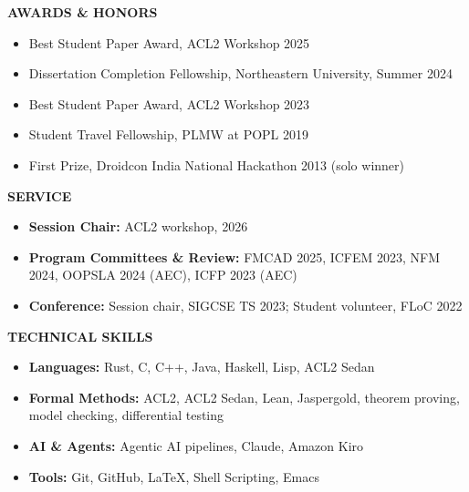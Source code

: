 \documentclass[11pt,letterpaper]{article}
\newcommand{\cvsection}[1]{
    \vspace{0.6em} {\color{darkblue}\textbf{\Large #1}}
    \vspace{0.15em} \textcolor{lightblue}{\hrulefill}
    \vspace{0.4em} }
\begin{document}
\cvsection{AWARDS \& HONORS}
\begin{itemize}
    \item Best Student Paper Award, ACL2 Workshop 2025
    \item Dissertation Completion Fellowship, Northeastern University,
      Summer 2024
    \item Best Student Paper Award, ACL2 Workshop 2023
    \item Student Travel Fellowship, PLMW at POPL 2019
    \item First Prize, Droidcon India National Hackathon 2013 (solo
      winner)
\end{itemize}

\cvsection{SERVICE}
\begin{itemize}
  \item \textbf{Session Chair:} ACL2 workshop, 2026
    \item \textbf{Program Committees \& Review:} FMCAD 2025, ICFEM
      2023, NFM 2024, OOPSLA 2024 (AEC), ICFP 2023 (AEC)
    \item \textbf{Conference:} Session chair, SIGCSE TS 2023; Student
      volunteer, FLoC 2022
\end{itemize}

\cvsection{TECHNICAL SKILLS}
\begin{itemize}
    \item \textbf{Languages:} Rust, C, C++, Java, Haskell, Lisp, ACL2 Sedan
    \item \textbf{Formal Methods:} ACL2, ACL2 Sedan, Lean, Jaspergold,
      theorem proving, model checking, differential testing
    \item \textbf{AI \& Agents:} Agentic AI pipelines, Claude, Amazon
      Kiro
    \item \textbf{Tools:} Git, GitHub, LaTeX, Shell Scripting, Emacs
\end{itemize}
\end{document}
